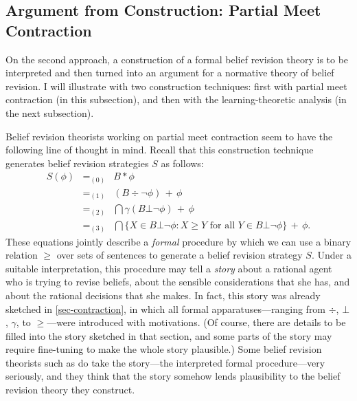 
\subsection{Argument from Construction: Partial Meet Contraction}\label{sec-arg-construction-1}

On the second approach, a construction of a formal belief revision theory is to be interpreted and then turned into an argument for a normative theory of belief revision. I will illustrate with two construction techniques: first with partial meet contraction (in this subsection), and then with the learning-theoretic analysis (in the next subsection).

Belief revision theorists working on partial meet contraction seem to have the following line of thought in mind. Recall that this construction technique generates belief revision strategies $S$ as follows: 
	\begin{eqnarray*}
	S(\phi) &=_{(0)}& B * \phi \\
			&=_{(1)}& (B \div  \neg\phi) \,+\, \phi \\
			&=_{(2)}& \bigcap \gamma(B \bot \neg\phi) \,+\, \phi \\
			&=_{(3)}& \bigcap \{ X \in B\bot\neg\phi : X \ge Y \mbox{ for all } Y \in B\bot\neg\phi \} \,+\, \phi.
	\end{eqnarray*}
These equations jointly describe a {\em formal} procedure by which we can use a binary relation $\ge$ over sets of sentences to generate a belief revision strategy $S$. Under a suitable interpretation, this procedure may tell a {\em story} about a rational agent who is trying to revise beliefs, about the sensible considerations that she has, and about the rational decisions that she makes. In fact, this story was already sketched in \autoref{sec-contraction}, in which all formal apparatuses---ranging from $\div$, $\bot$, $\gamma$, to $\ge$---were introduced with motivations. (Of course, there are details to be filled into the story sketched in that section, and some parts of the story may require fine-tuning to make the whole story plausible.) Some belief revision theorists such as \citet{gardenfors1984epistemic} do take the story---the interpreted formal procedure---very seriously, and they think that the story somehow lends plausibility to the belief revision theory they construct. 


